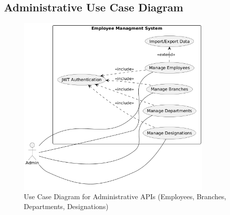 \subsection{Administrative Use Case Diagram}
\begin{figure}[H]
    \centering
    \includegraphics[width=0.85\textwidth]{chapters/chapter 3/sprint1_figures/use_case_Employee-managment.png}
    \caption{Use Case Diagram for Administrative APIs (Employees, Branches, Departments, Designations)}
    \label{fig:sprint1_usecase}
\end{figure}

